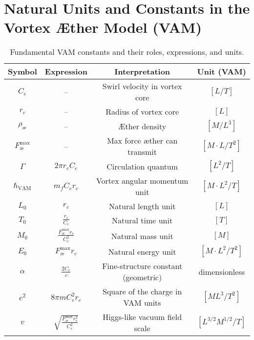 \section{Natural Units and Constants in the Vortex Æther Model (VAM)}
\renewcommand{\arraystretch}{1.3}
\begin{table}[H]
    \centering
    \footnotesize
    \caption{Fundamental VAM constants and their roles, expressions, and units.}
    \begin{tabular}{|c|c|c|c|}
        \hline
        \textbf{Symbol} & \textbf{Expression} & \textbf{Interpretation} & \textbf{Unit (VAM)} \\
        \hline
        $C_e$ & -- & Swirl velocity in vortex core & $[L/T]$ \\
        \hline
        $r_c$ & -- & Radius of vortex core & $[L]$ \\
        \hline
        $\rho_\text{\ae}$ & -- & Æther density & $[M/L^3]$ \\
        \hline
        $F^{\text{max}}_{\text{\ae}}$ & -- & Max force æther can transmit & $[M \cdot L / T^2]$ \\
        \hline
        $\Gamma$ & $2\pi r_c C_e$ & Circulation quantum & $[L^2 / T]$ \\
        \hline
        $\hbar_\text{VAM}$ & $m_f C_e r_c$ & Vortex angular momentum unit & $[M \cdot L^2 / T]$ \\
        \hline
        $L_0$ & $r_c$ & Natural length unit & $[L]$ \\
        \hline
        $T_0$ & $\frac{r_c}{C_e}$ & Natural time unit & $[T]$ \\
        \hline
        $M_0$ & $\frac{F^{\text{max}}_{\text{\ae}} r_c}{C_e^2}$ & Natural mass unit & $[M]$ \\
        \hline
        $E_0$ & $F^{\text{max}}_{\text{\ae}} r_c$ & Natural energy unit & $[M \cdot L^2 / T^2]$ \\
        \hline
        $\alpha$ & $\frac{2 C_e}{c}$ & Fine-structure constant (geometric) & dimensionless \\
        \hline
        $e^2$ & $8\pi m C_e^2 r_c$ & Square of the charge in VAM units & $[M L^3 / T^2]$ \\
        \hline
        $v$ & $\sqrt{\frac{F^{\text{max}}_{\text{\ae}} r_c^3}{C_e^2}}$ & Higgs-like vacuum field scale & $[L^{3/2} M^{1/2} / T]$ \\
        \hline
    \end{tabular}
    \label{tab:VAM_constants_summary}
\end{table}
